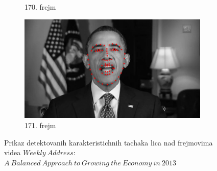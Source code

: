 \documentclass[a4paper, openany, oneside, 11pt]{book}
\begin{document}
\begin{figure}[!h]
\begin{subfigure}{0.475\textwidth}
            \caption{170. frejm}
            \label{fig:2_5c}
            \vspace{0pt}
        \end{subfigure}%
        \begin{subfigure}{0.475\textwidth}
            \centering
            \includegraphics[scale=0.15]{res/171lm.jpg}
            \caption{171. frejm}
            \label{fig:2_5d}
            \vspace{0pt}
        \end{subfigure}
        \caption{Prikaz detektovanih karakteristichnih tachaka lica nad frejmovima videa $Weekly\ Address$: $A\ Balanced\ Approach\ to\ Growing\ the\ Economy\ in\ 2013$}
        \label{fig:2_5}
\end{figure}
\newpage
\end{document}
